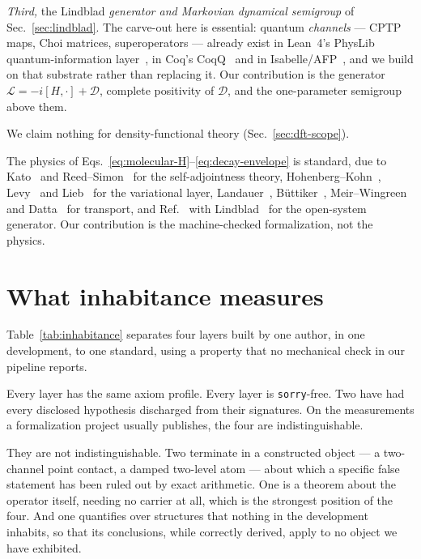 \documentclass[aps,prd,reprint,nofootinbib,superscriptaddress]{revtex4-2}
\newcommand{\Lean}{Lean~4}
\begin{document}
\emph{Third,} the Lindblad \emph{generator and Markovian dynamical semigroup} of
Sec.~\ref{sec:lindblad}. The carve-out here is essential: quantum \emph{channels} --- CPTP maps, Choi
matrices, superoperators --- already exist in \Lean{}'s PhysLib quantum-information
layer~\cite{leanQI2025}, in Coq's CoqQ~\cite{coqq2022} and in Isabelle/AFP~\cite{isabelleCBO}, and we
build on that substrate rather than replacing it. Our contribution is the generator
$\mathcal{L}=-i[H,\cdot]+\mathcal{D}$, complete positivity of $\mathcal{D}$, and the one-parameter
semigroup above them.

We claim nothing for density-functional theory (Sec.~\ref{sec:dft-scope}).

The physics of Eqs.~\eqref{eq:molecular-H}--\eqref{eq:decay-envelope} is standard, due to
Kato~\cite{kato1995} and Reed--Simon~\cite{reedSimon2} for the self-adjointness theory,
Hohenberg--Kohn~\cite{hohenbergKohn1964}, Levy~\cite{levy1979} and Lieb~\cite{lieb1983} for the
variational layer, Landauer~\cite{landauer1957}, B\"uttiker~\cite{buttiker1986},
Meir--Wingreen~\cite{meirWingreen1992} and Datta~\cite{datta1995} for transport, and
Ref.~\cite{gksl1976} with Lindblad~\cite{lindblad1976} for the open-system generator. Our
contribution is the machine-checked formalization, not the physics.

\section{What inhabitance measures}
\label{sec:synthesis}

Table~\ref{tab:inhabitance} separates four layers built by one author, in one development, to one
standard, using a property that no mechanical check in our pipeline reports.

Every layer has the same axiom profile. Every layer is \texttt{sorry}-free. Two have had every
disclosed hypothesis discharged from their signatures. On the measurements a formalization project
usually publishes, the four are indistinguishable.

They are not indistinguishable. Two terminate in a constructed object --- a two-channel point
contact, a damped two-level atom --- about which a specific false statement has been ruled out by
exact arithmetic. One is a theorem about the operator itself, needing no carrier at all, which is the
strongest position of the four. And one quantifies over structures that nothing in the development
inhabits, so that its conclusions, while correctly derived, apply to no object we have exhibited.
\end{document}
